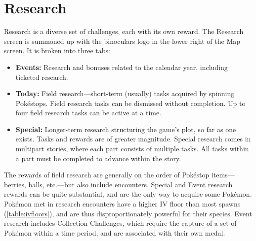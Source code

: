 \section{Research\label{sec:research}}
Research is a diverse set of challenges, each with its own reward.
The Research screen is summoned up with the binoculars logo in the lower right of the Map screen.
It is broken into three tabs:
\begin{itemize}
  \item \textbf{Events:} Research and bonuses related to the calendar year, including ticketed research.
  \item \textbf{Today:} Field research---short-term (usually) tasks acquired by spinning Pokéstops.
            Field research tasks can be dismissed without completion.
            Up to four field research tasks can be active at a time.
  \item \textbf{Special:} Longer-term research structuring the game's plot, so far as one exists.
    Tasks and rewards are of greater magnitude.
    Special research comes in multipart stories, where each part consists of multiple tasks.
    All tasks within a part must be completed to advance within the story.
\end{itemize}
The rewards of field research are generally on the order of Pokéstop items---berries, balls,
 etc.---but also include encounters.
Special and Event research rewards can be quite substantial, and are the only way to acquire some Pokémon.
Pokémon met in research encounters have a higher IV floor than most spawns (\autoref{table:ivfloors}),
  and are thus disproportionately powerful for their species.
Event research includes Collection Challenges, which require the capture of a set of Pokémon
  within a time period, and are associated with their own medal.

